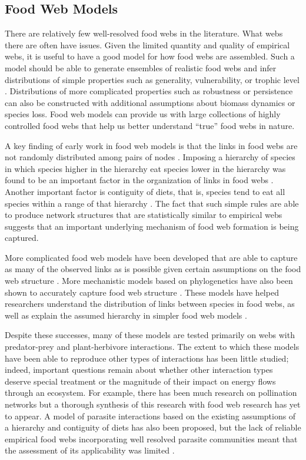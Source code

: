 \documentclass[../dissertation.tex]{subfiles}
\begin{document}
\begin{bibunit}
\section{Food Web Models}

There are relatively few well-resolved food webs in the literature. What webs
there are often have issues. Given the limited quantity and quality of
empirical webs, it is useful to have a good model for how food webs are
assembled. Such a model should be able to generate ensembles of realistic food
webs and infer distributions of simple properties such as generality,
vulnerability, or trophic level \cite*{Williams2000, Williams2008a}.
Distributions of more complicated properties such as robustness or persistence
can also be constructed with additional assumptions about biomass dynamics or
species loss. Food web models can provide us with large collections of highly
controlled food webs that help us better understand ``true'' food webs in
nature.

A key finding of early work in food web models is that the links in food webs
are not randomly distributed among pairs of nodes \cite*{Cohen1990}. Imposing a
hierarchy of species in which species higher in the hierarchy eat species lower
in the hierarchy was found to be an important factor in the organization of
links in food webs \cite*{Cohen1990}. Another important factor is contiguity of
diets, that is, species tend to eat all species within a range of that
hierarchy \cite*{Williams2000}. The fact that such simple rules are able to
produce network structures that are statistically similar to empirical webs
suggests that an important underlying mechanism of food web formation is being
captured.

More complicated food web models have been developed that are able to capture
as many of the observed links as is possible given certain assumptions on the
food web structure \cite*{Williams2010,Williams2011,Allesina2008}. More
mechanistic models based on phylogenetics have also been shown to accurately
capture food web structure \cite*{Cattin2004}. These models have helped
researchers understand the distribution of links between species in food webs,
as well as explain the assumed hierarchy in simpler food web models
\cite*{Williams2011}.
 
Despite these successes, many of these models are tested primarily on webs with
predator-prey and plant-herbivore interactions. The extent to which these
models have been able to reproduce other types of interactions has been little
studied; indeed, important questions remain about whether other interaction
types deserve special treatment or the magnitude of their impact on energy
flows through an ecosystem. For example, there has been much research on
pollination networks but a thorough synthesis of this research with food web
research has yet to appear. A model of parasite interactions based on the
existing assumptions of a hierarchy and contiguity of diets has also been
proposed, but the lack of reliable empirical food webs incorporating well
resolved parasite communities meant that the assessment of its applicability
was limited \cite*{Warren2010}. 


\end{bibunit}
\end{document}
